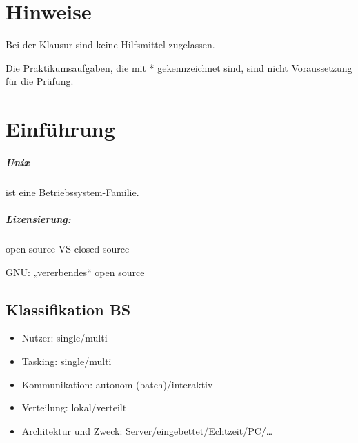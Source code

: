 




\maketitle
\newpage
\tableofcontents
\newpage

\chapter*{Hinweise}
Bei der Klausur sind keine Hilfsmittel zugelassen.

Die Praktikumsaufgaben, die mit * gekennzeichnet sind, sind nicht Voraussetzung für die Prüfung.

\chapter{Einführung}

\paragraph{Unix} ist eine Betriebssystem-Familie.

\paragraph{Lizensierung:} open source VS closed source

GNU: „vererbendes“ open source
\section{Klassifikation BS}
\begin{itemize}
\item Nutzer: single/multi
\item Tasking: single/multi
\item Kommunikation: autonom (batch)/interaktiv
\item Verteilung: lokal/verteilt
\item Architektur und Zweck: Server/eingebettet/Echtzeit/PC/…
\end{itemize}

